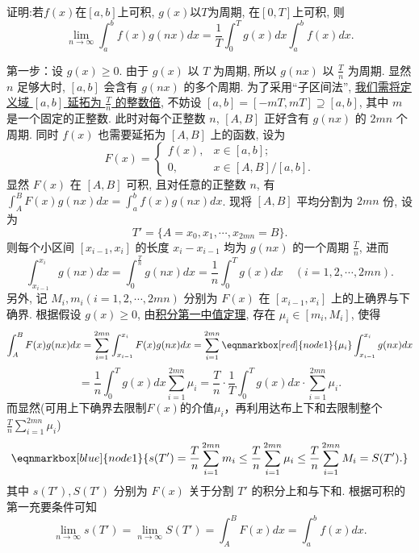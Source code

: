\documentclass[lang=cn,newtx,10pt,scheme=chinese]{elegantbook}
\begin{document}
\begin{lemma}[Riemann 引理]\label{lem:riemann}
 证明:若$f(x)$在$[a,b]$上可积, $g(x)$以$T$为周期, 在$[0,T]$上可积, 则
$$ \lim\limits_{n \to \infty} \int_{a}^{b} f(x)g(nx)dx = \frac{1}{T}\int_{0}^{T} g(x)dx \int_{a}^{b} f(x)dx. $$
\end{lemma}

\begin{solution}
第一步：设 $g(x) \ge 0$. 由于 $g(x)$ 以 $T$ 为周期, 所以 $g(nx)$ 以 $\frac{T}{n}$ 为周期. 显然 $n$ 足够大时, $[a, b]$ 会含有 $g(nx)$ 的多个周期. 为了采用“子区间法”, \underline{我们需将定义域 $[a, b]$ 延拓为 $\frac{T}{n}$ 的整数倍}, 不妨设 $[a, b] = [-mT, mT] \supseteq [a, b]$, 其中 $m$ 是一个固定的正整数. 此时对每个正整数 $n$, $[A, B]$ 正好含有 $g(nx)$ 的 $2mn$ 个周期. 同时 $f(x)$ 也需要延拓为 $[A, B]$ 上的函数, 设为
$$F(x) = \begin{cases} f(x), & x \in [a, b]; \\ 0, & x \in [A, B]/[a, b]. \end{cases}$$
显然 $F(x)$ 在 $[A, B]$ 可积, 且对任意的正整数 $n$, 有 $\int_A^B F(x)g(nx) dx = \int_a^b f(x)g(nx) dx$.
现将 $[A, B]$ 平均分割为 $2mn$ 份, 设为
$$T' = \{A=x_0, x_1, \cdots, x_{2mn}=B \}.$$
则每个小区间 $[x_{i-1}, x_i]$ 的长度 $x_i - x_{i-1}$ 均为 $g(nx)$ 的一个周期 $\frac{T}{n}$, 进而
$$\int_{x_{i-1}}^{x_i} g(nx) dx = \int_0^{\frac{T}{n}} g(nx) dx = \frac{1}{n} \int_0^T g(x) dx \quad (i=1, 2, \cdots, 2mn).$$
另外, 记 $M_i, m_i (i=1, 2, \cdots, 2mn)$ 分别为 $F(x)$ 在 $[x_{i-1}, x_i]$ 上的上确界与下确界. 根据假设 $g(x) \ge 0$, 由\underline{积分第一中值定理}, 存在 $\mu_i \in [m_i, M_i]$, 使得
\begin{equation*}
\int_A^B F(x)g(nx) dx = \sum_{i=1}^{2mn} \int_{x_{i-1}}^{x_i} F(x)g(nx) dx = \sum_{i=1}^{2mn} \eqnmarkbox[red]{node1}{\mu_i} \int_{x_{i-1}}^{x_i} g(nx) dx
\end{equation*}
$$= \frac{1}{n} \int_0^T g(x) dx \sum_{i=1}^{2mn} \mu_i = \frac{T}{n} \cdot \frac{1}{T} \int_0^T g(x) dx \cdot \sum_{i=1}^{2mn} \mu_i.$$
而显然(可用上下确界去限制$F(x)$的介值$\mu_i$，再利用达布上下和去限制整个$\frac{T}{n} \sum_{i=1}^{2mn} \mu_i$)
\begin{equation*}
\eqnmarkbox[blue]{node1}{s(T') = \frac{T}{n} \sum_{i=1}^{2mn} m_i \le \frac{T}{n} \sum_{i=1}^{2mn} \mu_i \le \frac{T}{n} \sum_{i=1}^{2mn} M_i = S(T').}
\end{equation*}
其中 $s(T'), S(T')$ 分别为 $F(x)$ 关于分割 $T'$ 的积分上和与下和. 根据可积的第一充要条件可知
$$\lim_{n \to \infty} s(T') = \lim_{n \to \infty} S(T') = \int_A^B F(x) dx = \int_a^b f(x) dx.$$

\end{solution}
\end{document}
